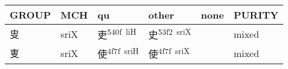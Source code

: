 \documentclass[14pt,a4paper]{scrartcl}
\begin{document}
\begin{longtable}[c]{@{}llllll@{}}
\toprule
\begin{minipage}[b]{0.14\columnwidth}\raggedright\strut
GROUP
\strut\end{minipage} &
\begin{minipage}[b]{0.14\columnwidth}\raggedright\strut
MCH
\strut\end{minipage} &
\begin{minipage}[b]{0.14\columnwidth}\raggedright\strut
qu
\strut\end{minipage} &
\begin{minipage}[b]{0.14\columnwidth}\raggedright\strut
other
\strut\end{minipage} &
\begin{minipage}[b]{0.14\columnwidth}\raggedright\strut
none
\strut\end{minipage} &
\begin{minipage}[b]{0.14\columnwidth}\raggedright\strut
PURITY
\strut\end{minipage}\tabularnewline
\midrule
\endhead
\begin{minipage}[t]{0.14\columnwidth}\raggedright\strut
㕜
\strut\end{minipage} &
\begin{minipage}[t]{0.14\columnwidth}\raggedright\strut
sriX
\strut\end{minipage} &
\begin{minipage}[t]{0.14\columnwidth}\raggedright\strut
吏\textsuperscript{540f~liH}
\strut\end{minipage} &
\begin{minipage}[t]{0.14\columnwidth}\raggedright\strut
史\textsuperscript{53f2~sriX}
\strut\end{minipage} &
\begin{minipage}[t]{0.14\columnwidth}\raggedright\strut
\strut\end{minipage} &
\begin{minipage}[t]{0.14\columnwidth}\raggedright\strut
mixed
\strut\end{minipage}\tabularnewline
\begin{minipage}[t]{0.14\columnwidth}\raggedright\strut
叓
\strut\end{minipage} &
\begin{minipage}[t]{0.14\columnwidth}\raggedright\strut
sriX
\strut\end{minipage} &
\begin{minipage}[t]{0.14\columnwidth}\raggedright\strut
使\textsuperscript{4f7f~sriH}
\strut\end{minipage} &
\begin{minipage}[t]{0.14\columnwidth}\raggedright\strut
使\textsuperscript{4f7f~sriX}
\strut\end{minipage} &
\begin{minipage}[t]{0.14\columnwidth}\raggedright\strut
\strut\end{minipage} &
\begin{minipage}[t]{0.14\columnwidth}\raggedright\strut
mixed
\strut\end{minipage}\tabularnewline
\bottomrule
\end{longtable}
\end{document}
